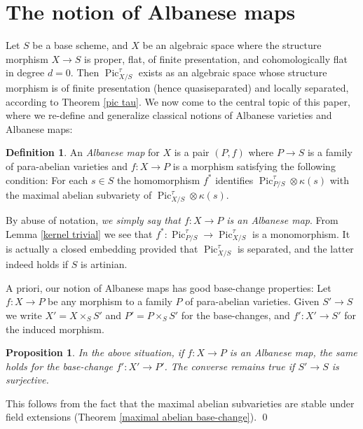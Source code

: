 \documentclass[oneside, 12pt]{amsart}
\newcommand\mylabel[1]{\label{#1}\marginpar{\raggedright\vspace{-1ex}\medskip\medskip\footnotesize \tt #1}}
\renewcommand\mylabel[1]{\label{#1}}
\newtheorem{proposition}[theorem]{Proposition}
\theoremstyle{definition}
\newtheorem{definition}[theorem]{Definition}
\theoremstyle{remark}
\newcommand{\Pic}{\operatorname{Pic}}
\newcommand{\ra}{\rightarrow}
\begin{document}
\section{The notion of Albanese maps}
\mylabel{Albanese maps}
 
Let $S$ be a base scheme, and $X$ be an algebraic space where the structure morphism $X\ra S$
is proper, flat, of finite presentation, and  cohomologically flat in degree $d=0$. 
Then $\Pic_{X/S}^\tau$ exists as an algebraic space whose structure morphism is of finite presentation (hence quasiseparated) and locally separated, according to Theorem \ref{pic tau}.
We now come to the central topic of this paper, where we re-define and generalize 
classical notions of Albanese varieties and Albanese maps:

\begin{definition}
\mylabel{definition albanese map}
An \emph{Albanese map} for $X$ is a pair $(P,f)$ where $P\ra S$ is a family of para-abelian varieties 
and $f:X\ra P$ is a morphism satisfying the  following condition: For each   $s\in S$ the homomorphism $f^*$ identifies
$\Pic^\tau_{P/S}\otimes \kappa(s)$ with the maximal abelian subvariety of $\Pic^\tau_{X/S}\otimes\kappa(s)$.
\end{definition}

By abuse of notation, \emph{we simply say that $f:X\ra P$ is an Albanese map}.
From Lemma \ref{kernel trivial} we see that  $f^*:\Pic^\tau_{P/S}\ra \Pic^\tau_{X/S}$ is a monomorphism.
It is actually a  closed embedding provided that $\Pic^\tau_{X/S}$ is separated, and the latter indeed
holds if $S$ is artinian.  
 
A priori, our notion of Albanese maps has good base-change properties:
Let $f:X\ra P$ be   any morphism to a family $P$ of para-abelian varieties. Given  $S'\ra S$ we write
$X'=X\times_SS'$ and $P'=P\times_SS'$ for the base-changes, and $f':X'\ra S'$ for the induced morphism.

\begin{proposition}
\mylabel{base-change albanese map}
In the above situation, if $f:X\ra P$ is an Albanese map, the same holds for the base-change $f':X'\ra P'$.
The converse remains true  if   $S'\ra S$ is surjective.
\end{proposition}

\proof
This follows from the fact that the  maximal abelian subvarieties
are stable under field extensions (Theorem \ref{maximal abelian base-change}).
\qed
\end{document}

